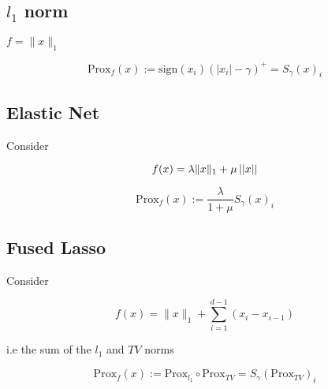 \documentclass{article}
\begin{document}
\subsection{\(l_1\) norm}
\(f = \|x\|_1\)

\begin{equation}
\mathrm{Prox}_f\left(x\right) := \mathrm{sign}(x_i)\left(|x_i| - \gamma\right)^+ = S_\gamma\left(x\right)_i 
\end{equation}

\subsection{Elastic Net}
Consider

\begin{equation}
f(x) = \lambda\|x\|_1 + \mu \left|\left|x\right|\right| 
\end{equation}

\begin{equation}
\mathrm{Prox}_f\left(x\right) := \frac{\lambda}{1+\mu} S_\gamma\left(x\right)_i 
\end{equation}

\subsection{Fused Lasso}
Consider

\begin{equation}
f(x) = \|x\|_1 + \sum_{i=1}^{d-1} \left( x_i - x_{i-1} \right) 
\end{equation}

i.e the sum of the \(l_1\) and \(TV\) norms

\begin{equation}
\mathrm{Prox}_f\left(x\right) := \mathrm{Prox}_{l_1} \circ \mathrm{Prox}_{TV} =  S_\gamma\left(\mathrm{Prox}_{TV}\right)_i 
\end{equation}
\end{document}
